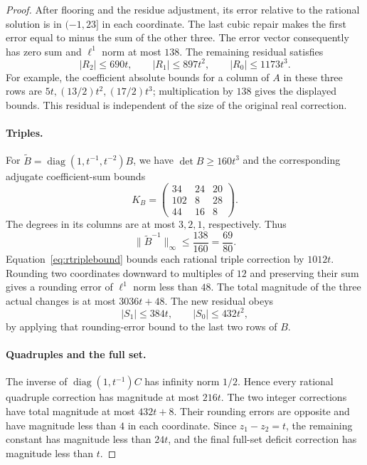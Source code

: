 \documentclass[11pt,a4paper]{article}
\theoremstyle{definition}
\DeclareMathOperator{\diag}{diag}
\begin{document}
\begin{proof}
After flooring and the residue adjustment, its error relative to the
rational solution is in $(-1,23]$ in each coordinate.
The last cubic repair makes the first error equal to minus the sum of
the other three. The error vector consequently has zero sum and
$\ell^1$ norm at most $138$.
The remaining residual satisfies
\begin{equation}\label{eq:rtriplebound}
 |R_2|\le690t,\qquad |R_1|\le897t^2,\qquad |R_0|\le1173t^3.
\end{equation}
For example, the coefficient absolute bounds for a column of $A$ in these
three rows are $5t,(13/2)t^2,(17/2)t^3$; multiplication by $138$ gives
the displayed bounds. This residual is independent of the size of the
original real correction.

\paragraph{Triples.}
For $\widetilde B=\diag(1,t^{-1},t^{-2})B$, we have
$\det B\ge160t^3$ and the corresponding adjugate coefficient-sum bounds
\[
 K_B=\begin{pmatrix}34&24&20\\102&8&28\\44&16&8\end{pmatrix}.
\]
The degrees in its columns are at most $3,2,1$, respectively.
Thus
\[
 \|\widetilde B^{-1}\|_\infty\le\frac{138}{160}=\frac{69}{80}.
\]
Equation~\eqref{eq:rtriplebound} bounds each rational triple correction
by $1012t$.
Rounding two coordinates downward to multiples of $12$ and preserving
their sum gives a rounding error of $\ell^1$ norm less than $48$.
The total magnitude of the three actual changes is at most $3036t+48$.
The new residual obeys
\begin{equation}\label{eq:rquadbound}
 |S_1|\le384t,\qquad |S_0|\le432t^2,
\end{equation}
by applying that rounding-error bound to the last two rows of $B$.

\paragraph{Quadruples and the full set.}
The inverse of $\diag(1,t^{-1})C$ has infinity norm $1/2$.
Hence every rational quadruple correction has magnitude at most $216t$.
The two integer corrections have total magnitude at most $432t+8$.
Their rounding errors are opposite and have magnitude less than $4$
in each coordinate. Since $z_1-z_2=t$, the remaining constant has
magnitude less than $24t$, and the final full-set deficit correction has
magnitude less than $t$.


\end{proof}
\end{document}
